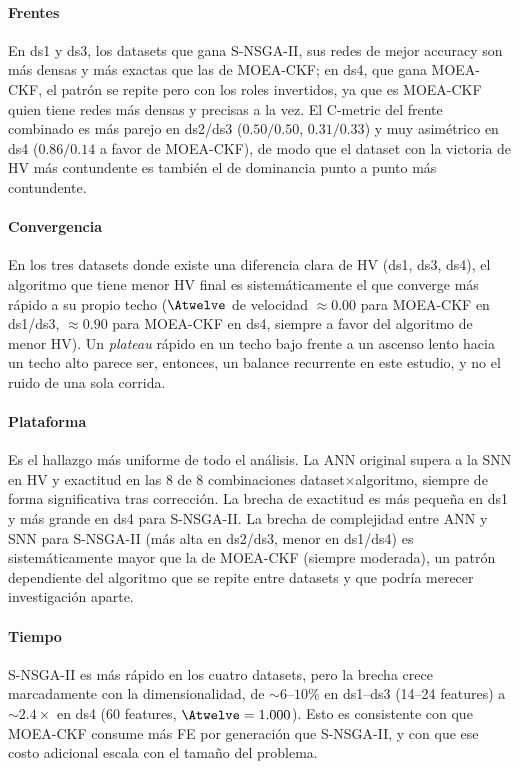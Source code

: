 \paragraph{Frentes} En ds1 y ds3, los datasets que gana S-NSGA-II, sus redes de mejor accuracy son más densas y más exactas que las de MOEA-CKF; en ds4, que gana MOEA-CKF, el patrón se repite pero con los roles invertidos, ya que es MOEA-CKF quien tiene redes más densas y precisas a la vez. El C-metric del frente combinado es más parejo en ds2/ds3 ($0.50/0.50$, $0.31/0.33$) y muy asimétrico en ds4 ($0.86/0.14$ a favor de MOEA-CKF), de modo que el dataset con la victoria de HV más contundente es también el de dominancia punto a punto más contundente.

\paragraph{Convergencia} En los tres datasets donde existe una diferencia clara de HV (ds1, ds3, ds4), el algoritmo que tiene menor HV final es sistemáticamente el que converge más rápido a su propio techo ($\Atwelve$ de velocidad $\approx0.00$ para MOEA-CKF en ds1/ds3, $\approx0.90$ para MOEA-CKF en ds4, siempre a favor del algoritmo de menor HV). Un \textit{plateau} rápido en un techo bajo frente a un ascenso lento hacia un techo alto parece ser, entonces, un balance recurrente en este estudio, y no el ruido de una sola corrida.

\paragraph{Plataforma} Es el hallazgo más uniforme de todo el análisis. La ANN original supera a la SNN en HV y exactitud en las 8 de 8 combinaciones dataset$\times$algoritmo, siempre de forma significativa tras corrección. La brecha de exactitud es más pequeña en ds1 y más grande en ds4 para S-NSGA-II. La brecha de complejidad entre ANN y SNN para S-NSGA-II (más alta en ds2/ds3, menor en ds1/ds4) es sistemáticamente mayor que la de MOEA-CKF (siempre moderada), un patrón dependiente del algoritmo que se repite entre datasets y que podría merecer investigación aparte.

\paragraph{Tiempo} S-NSGA-II es más rápido en los cuatro datasets, pero la brecha crece marcadamente con la dimensionalidad, de $\sim6$--$10\%$ en ds1--ds3 (14--24 features) a $\sim2.4\times$ en ds4 (60 features, $\Atwelve=1.000$). Esto es consistente con que MOEA-CKF consume más FE por generación que S-NSGA-II, y con que ese costo adicional escala con el tamaño del problema.

